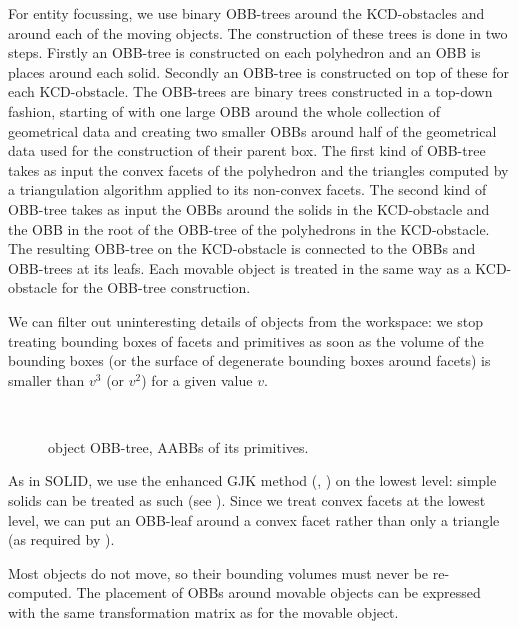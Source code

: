 For entity focussing, we use binary OBB-trees around the KCD-obstacles
and around each of the moving objects. The construction of these trees is
done in two steps. Firstly an OBB-tree is constructed on 
each polyhedron and an OBB is places around each solid.
Secondly an OBB-tree is constructed on top of these for
each KCD-obstacle. The OBB-trees are binary trees constructed 
in a top-down fashion, starting of with one large OBB around 
the whole collection of geometrical data and creating two 
smaller OBBs around half of the geometrical data used for the
construction of their parent box. The first kind of OBB-tree
takes as input the convex facets of the polyhedron and the
triangles computed by a triangulation algorithm applied to 
its non-convex facets. The second kind of OBB-tree takes as
input the OBBs around the solids in the KCD-obstacle and the
OBB in the root of the OBB-tree of the polyhedrons in 
the KCD-obstacle. The resulting OBB-tree on the KCD-obstacle
is connected to the OBBs and OBB-trees at its leafs.
Each movable object is treated in the same way as a 
KCD-obstacle for the OBB-tree construction. 

We can filter out uninteresting details of objects from the workspace:
we stop treating bounding boxes of facets and primitives as soon as
the volume of the bounding boxes (or the surface of degenerate 
bounding boxes around facets) is smaller than $v^3$ (or $v^2$) 
for a given value $v$.
\begin{center}
\begin{figure}[!hpt]
	\mbox{
              \hspace{.2cm}  
              \hspace{.2cm}  
	}
        \caption{object OBB-tree, AABBs of its primitives.}
        \label{bbs}
\end{figure}
\end{center}
\vspace{-0.5cm}
As in SOLID, we use the enhanced GJK method (\cite{GilJohKee88}, \cite{Cam97})
on the lowest level: simple solids can be treated as such (see \cite{GilFoo90}).
Since we treat convex facets at the lowest level, we can put an OBB-leaf
around a convex facet rather than only a triangle (as required by \cite{GotLinMan96}).

Most objects do not move, so their bounding volumes must never be
re-computed. The placement of OBBs around movable objects can be
expressed with the same transformation matrix as for the movable object.

